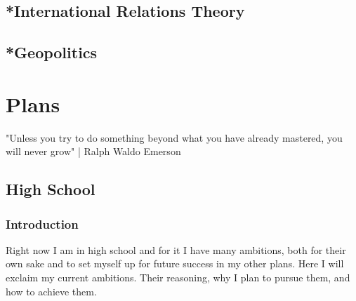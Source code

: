 \section{*International Relations Theory}
\section{*Geopolitics}


\chapter{Plans}
"Unless you try to do something beyond what you have already mastered, you will never grow" | Ralph Waldo Emerson
\section{High School}
\subsection{Introduction}
\par Right now I am in high school and for it I have many ambitions, both for their own sake and to set myself up for future success in my other plans. Here I will exclaim my current ambitions. Their reasoning, why I plan to pursue them, and how to achieve them.


